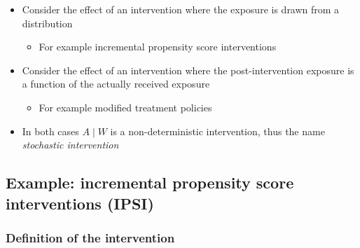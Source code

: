 \documentclass[
  12pt,
]{book}
\providecommand{\tightlist}{%
  \setlength{\itemsep}{0pt}\setlength{\parskip}{0pt}}
\theoremstyle{definition}
\theoremstyle{definition}
\theoremstyle{definition}
\newcommand{\1}{\mathbbm{1}}
\begin{document}
\begin{itemize}
\tightlist
\item
  Consider the effect of an intervention where the exposure is drawn from a
  distribution

  \begin{itemize}
  \tightlist
  \item
    For example incremental propensity score interventions
  \end{itemize}
\item
  Consider the effect of an intervention where the post-intervention exposure is
  a function of the actually received exposure

  \begin{itemize}
  \tightlist
  \item
    For example modified treatment policies
  \end{itemize}
\item
  In both cases \(A \mid W\) is a non-deterministic intervention, thus the name
  \emph{stochastic intervention}
\end{itemize}

\hypertarget{ipsi}{%
\subsection{\texorpdfstring{Example: incremental propensity score interventions (IPSI) \citep{kennedy2018nonparametric}}{Example: incremental propensity score interventions (IPSI) {[}@kennedy2018nonparametric{]}}}\label{ipsi}}

\hypertarget{definition-of-the-intervention}{%
\subsubsection*{Definition of the intervention}\label{definition-of-the-intervention}}
\end{document}
